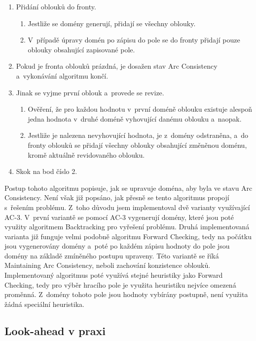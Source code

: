 \begin{enumerate}
    \item Přidání oblouků do fronty.
    \begin{enumerate}
        \item Jestliže se domény generují, přidají se všechny oblouky.
        \item V~případě úpravy domén po zápisu do pole se do fronty přidají
            pouze oblouky obsahující zapisované pole.
    \end{enumerate}
    \item Pokud je fronta oblouků prázdná, je dosažen stav Arc Consistency
        a~vykonávání algoritmu končí.
    \item Jinak se vyjme první oblouk a~provede se revize.
    \begin{enumerate}
        \item Ověření, že pro každou hodnotu v~první doméně oblouku existuje
            alespoň jedna hodnota v~druhé doméně vyhovující danému oblouku
            a~naopak.
        \item Jestliže je nalezena nevyhovující hodnota, je z~domény
            odstraněna, a~do fronty oblouků se přidají všechny oblouky
            obsahující změněnou doménu, kromě aktuálně revidovaného oblouku.
    \end{enumerate}
    \item Skok na bod číslo 2.
\end{enumerate}

Postup tohoto algoritmu popisuje, jak se upravuje doména, aby byla ve stavu
Arc Consistency. Není však již popsáno, jak přesně se tento algoritmus propojí
s~řešením problému. Z~toho důvodu jsem implementoval dvě varianty využívající
AC-3. V~první variantě se pomocí AC-3 vygenerují domény, které jsou poté
využity algoritmem Backtracking pro vyřešení problému. Druhá implementovaná
varianta již funguje velmi podobně algoritmu Forward Checking, tedy na počátku
jsou vygenerovány domény a~poté po každém zápisu hodnoty do pole jsou domény
na základě zmíněného postupu upraveny. Této variantě se říká Maintaining Arc
Consistency, neboli zachování konzistence oblouků. Implementovaný algoritmus
poté využívá stejné heuristiky jako Forward Checking, tedy pro výběr hracího
pole je využita heuristiku nejvíce omezená proměnná. Z~domény tohoto pole jsou
hodnoty vybírány postupně, není využita žádná speciální heuristika.

\subsection{Look-ahead v praxi}

